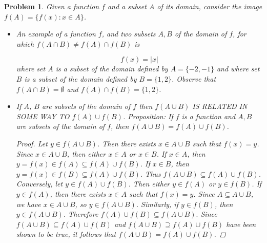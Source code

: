 \documentclass[12pt]{article}
\newtheorem{problem}{Problem}
\begin{document}
\begin{problem} %
Given a function $f$ and a subset $A$ of its domain, consider the image $f(A) = \{f(x) : x \in A\}$.

\begin{itemize}
\item[(a)] An example of a function $f$, and two subsets $A,B$ of the domain of $f$, for which $f(A \cap B) \neq f(A) \cap f(B)$ is

	$$f(x) = |x|$$
	where set $A$ is a subset of the domain defined by $A = \{-2,-1\}$ and where set $B$ is a subset of the domain defined by $B = \{1,2\}$. Observe that $f(A \cap B) = \emptyset$ and $f(A) \cap f(B) = \{1,2\}$.
\item[(b)] If $A$, $B$ are subsets of the domain of $f$ then $f(A \cup B)$ IS RELATED IN SOME WAY TO $f(A) \cup f(B)$.
\newline \newline	Proposition: If $f$ is a function and $A,B$ are subsets of the domain of $f$, then $f(A \cup B) = f(A) \cup f(B)$.
\begin{proof}
Let $y \in f(A \cup B)$. Then there exists $x \in A \cup B$ such that $f(x) = y$. Since $x \in A \cup B$, then either $x \in A$ or $x \in B$. If $x \in A$, then $y = f(x) \in f(A) \subseteq f(A) \cup f(B)$. If $x \in B$, then $y = f(x) \in f(B) \subseteq f(A) \cup f(B)$. Thus $f(A \cup B) \subseteq f(A) \cup f(B)$. \newline\newline Conversely, let $y \in f(A) \cup f(B)$. Then either $y \in f(A)$ or $y \in f(B)$. If $y \in f(A)$, then there exists $x \in A$ such that $f(x) = y$. Since $A \subseteq A \cup B$, we have $x \in A \cup B$, so $y \in f(A \cup B)$. Similarly, if $y \in f(B)$, then $y \in f(A \cup B)$. Therefore $f(A) \cup f(B) \subseteq f(A \cup B).$ \newline \newline Since  $f(A \cup B) \subseteq f(A) \cup f(B)$ and $f(A \cup B) \supseteq f(A) \cup f(B)$ have been shown to be true, it follows that $f(A \cup B) = f(A) \cup f(B)$.
\end{proof}
\end{itemize}
\end{problem}
\end{document}
